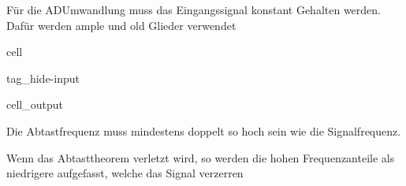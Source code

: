 \documentclass[letterpaper,10pt,english]{jupyterBook}
\begin{document}
\sphinxAtStartPar
Für die AD\sphinxhyphen{}Umwandlung muss das Eingangssignal konstant Gehalten werden.
Dafür werden ample und old Glieder verwendet

\begin{sphinxuseclass}{cell}
\begin{sphinxuseclass}{tag_hide-input}\begin{sphinxVerbatimOutput}

\begin{sphinxuseclass}{cell_output}
\noindent{}

\end{sphinxuseclass}\end{sphinxVerbatimOutput}

\end{sphinxuseclass}
\end{sphinxuseclass}
\begin{DUlineblock}{0em}
\item[] 
\end{DUlineblock}

\sphinxAtStartPar
Die Abtastfrequenz muss mindestens doppelt so hoch sein wie die Signalfrequenz.

\sphinxAtStartPar
Wenn das Abtasttheorem verletzt wird,
so werden die hohen Frequenzanteile als niedrigere aufgefasst,
welche das Signal verzerren

\begin{DUlineblock}{0em}
\item[] 
\end{DUlineblock}

\begin{DUlineblock}{0em}
\item[] 
\end{DUlineblock}

\begin{DUlineblock}{0em}
\item[] 
\end{DUlineblock}

\begin{DUlineblock}{0em}
\item[] 
\end{DUlineblock}
\end{document}
